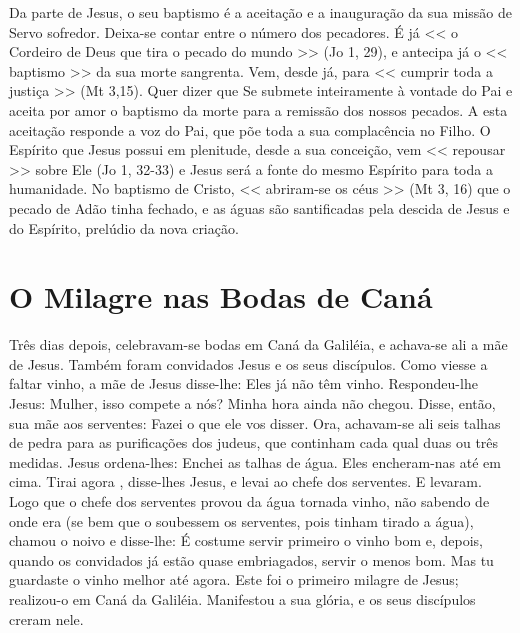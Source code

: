 \documentclass{rosario}
\begin{document}
Da parte de Jesus, o seu baptismo é a aceitação e a inauguração da sua missão de Servo sofredor.
Deixa-se contar entre o número dos pecadores.
É já << o Cordeiro de Deus que tira o pecado do mundo >> (Jo 1, 29), e antecipa já o << baptismo >> da sua morte sangrenta.
Vem, desde já, para << cumprir toda a justiça >> (Mt 3,15).
Quer dizer que Se submete inteiramente à vontade do Pai e aceita por amor o baptismo da morte para a remissão dos nossos pecados.
A esta aceitação responde a voz do Pai, que põe toda a sua complacência no Filho.
O Espírito que Jesus possui em plenitude, desde a sua conceição, vem << repousar >> sobre Ele (Jo 1, 32-33) e Jesus será a fonte do mesmo Espírito para toda a humanidade.
No baptismo de Cristo, << abriram-se os céus >> (Mt 3, 16) que o pecado de Adão tinha fechado, e as águas são santificadas pela descida de Jesus e do Espírito, prelúdio da nova criação.


\section{O Milagre nas Bodas de Caná}





Três dias depois, celebravam-se bodas em Caná da Galiléia, e achava-se ali a mãe de Jesus.
Também foram convidados Jesus e os seus discípulos.
Como viesse a faltar vinho, a mãe de Jesus disse-lhe:
Eles já não têm vinho.
Respondeu-lhe Jesus:
Mulher, isso compete a nós? Minha hora ainda não chegou.
Disse, então, sua mãe aos serventes:
Fazei o que ele vos disser.
Ora, achavam-se ali seis talhas de pedra para as purificações dos judeus, que continham cada qual duas ou três medidas.
Jesus ordena-lhes:
Enchei as talhas de água.
Eles encheram-nas até em cima.
Tirai agora , disse-lhes Jesus, e levai ao chefe dos serventes.
E levaram.
Logo que o chefe dos serventes provou da água tornada vinho, não sabendo de onde era (se bem que o soubessem os serventes, pois tinham tirado a água), chamou o noivo
e disse-lhe:
É costume servir primeiro o vinho bom e, depois, quando os convidados já estão quase embriagados, servir o menos bom.
Mas tu guardaste o vinho melhor até agora.
Este foi o primeiro milagre de Jesus;
realizou-o em Caná da Galiléia.
Manifestou a sua glória, e os seus discípulos creram nele.
\end{document}
